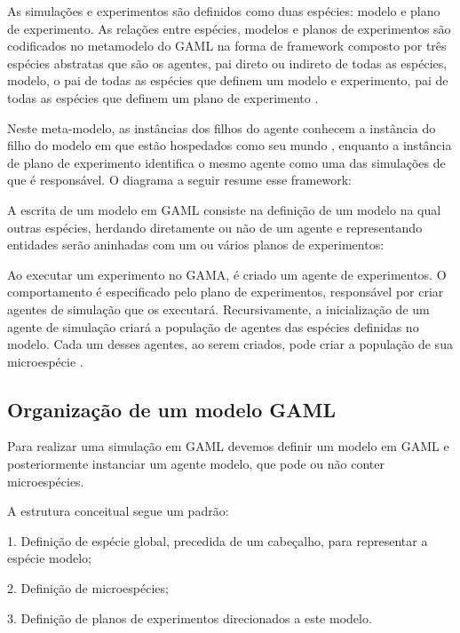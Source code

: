 As simulações e experimentos são definidos como duas espécies: modelo e plano de experimento. As relações entre espécies, modelos e planos de experimentos são codificados no metamodelo do GAML na forma de framework composto por três espécies abstratas que são os agentes, pai direto ou indireto de todas as espécies, modelo, o pai de todas as espécies que definem um modelo e experimento, pai de todas as espécies que definem um plano de experimento \cite{gamaplataform}.

Neste meta-modelo, as instâncias dos filhos do agente conhecem a instância do filho do modelo em que estão hospedados como seu mundo , enquanto a instância de plano de experimento identifica o mesmo agente como uma das simulações de que é responsável. O diagrama a seguir resume esse framework:



A escrita de um modelo em GAML consiste na definição de um modelo na qual outras espécies, herdando diretamente ou não de um agente e representando entidades serão aninhadas com um ou vários planos de experimentos:

Ao executar um experimento no GAMA, é criado um agente de experimentos. O comportamento é especificado pelo plano de experimentos, responsável por criar agentes de simulação que os executará. Recursivamente, a inicialização de um agente de simulação criará a população de agentes das espécies definidas no modelo. Cada um desses agentes, ao serem criados, pode criar a população de sua microespécie \cite{gamaplataform}. 


\subsection{Organização de um modelo GAML}

Para realizar uma simulação em GAML devemos definir um modelo em GAML e posteriormente instanciar um agente modelo, que pode ou não conter microespécies.

A estrutura conceitual segue um padrão:

1. Definição de espécie global, precedida de um cabeçalho, para representar a espécie modelo;

2. Definição de microespécies;

3. Definição de planos de experimentos direcionados a este modelo.

